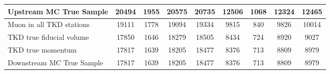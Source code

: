 \begin{landscape}
\begin{table}
\begin{tabular}[pos]{l|cccccccc}
\hline                                            
Upstream MC True Sample                            &   20494  &    1955  &   20575  &   20735  &   12506  &    1068  &   12324  &   12465  \\
\hline                                            
Muon in all TKD stations                           &   19111  &    1778  &   19094  &   19334  &    9815  &     840  &    9826  &   10014  \\
TKD true fiducial volume                           &   17850  &    1646  &   18279  &   18505  &    8434  &     724  &    8920  &    9027  \\
TKD true momentum                                  &   17817  &    1639  &   18205  &   18477  &    8376  &     713  &    8809  &    8979  \\
\hline                                            
Downstream MC True Sample                          &   17817  &    1639  &   18205  &   18477  &    8376  &     713  &    8809  &    8979  \\
\hline                                            

\end{tabular}
\end{table}
\end{landscape}

